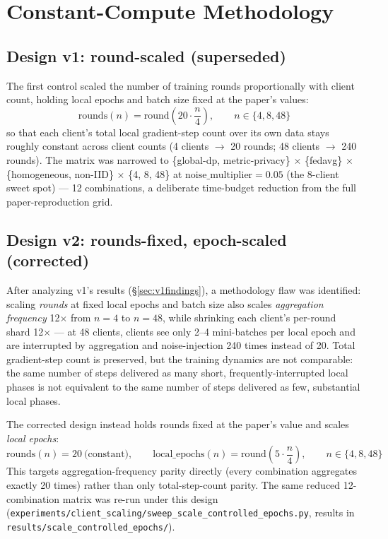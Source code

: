 \documentclass[11pt]{article}
\newcommand{\code}[1]{\texttt{#1}}
\begin{document}
\section{Constant-Compute Methodology}
\label{sec:methodology}

\subsection{Design v1: round-scaled (superseded)}
\label{sec:v1design}

The first control scaled the number of training rounds proportionally with client count, holding
local epochs and batch size fixed at the paper's values:
\[
    \text{rounds}(n) = \text{round}\!\left(20 \cdot \frac{n}{4}\right), \qquad
    n \in \{4, 8, 48\}
\]
so that each client's total local gradient-step count over its own data stays roughly constant
across client counts (4 clients $\to$ 20 rounds; 48 clients $\to$ 240 rounds). The matrix was
narrowed to \{global-dp, metric-privacy\} $\times$ \{fedavg\} $\times$ \{homogeneous, non-IID\}
$\times$ \{4, 8, 48\} at $\text{noise\_multiplier}=0.05$ (the 8-client sweet spot) --- 12
combinations, a deliberate time-budget reduction from the full paper-reproduction grid.

\subsection{Design v2: rounds-fixed, epoch-scaled (corrected)}
\label{sec:v2design}

After analyzing v1's results (\S\ref{sec:v1findings}), a methodology flaw was identified: scaling
\emph{rounds} at fixed local epochs and batch size also scales \emph{aggregation frequency} 12$\times$
from $n{=}4$ to $n{=}48$, while shrinking each client's per-round shard 12$\times$ --- at 48 clients,
clients see only 2--4 mini-batches per local epoch and are interrupted by aggregation and
noise-injection 240 times instead of 20. Total gradient-step count is preserved, but the training
dynamics are not comparable: the same number of steps delivered as many short, frequently-interrupted
local phases is not equivalent to the same number of steps delivered as few, substantial local
phases.

The corrected design instead holds rounds fixed at the paper's value and scales \emph{local epochs}:
\[
    \text{rounds}(n) = 20 \ \text{(constant)}, \qquad
    \text{local\_epochs}(n) = \text{round}\!\left(5 \cdot \frac{n}{4}\right), \qquad
    n \in \{4, 8, 48\}
\]
This targets aggregation-frequency parity directly (every combination aggregates exactly 20 times)
rather than only total-step-count parity. The same reduced 12-combination matrix was re-run under
this design (\code{experiments/client\_scaling/sweep\_scale\_controlled\_epochs.py}, results in
\code{results/scale\_controlled\_epochs/}).
\end{document}
